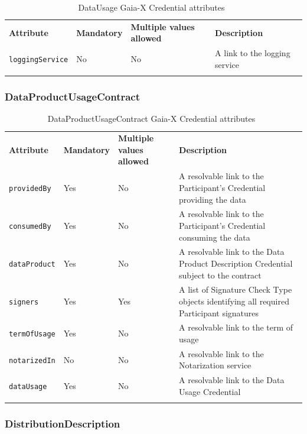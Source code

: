 \begin{longtable}{ |p{4cm}|p{2cm}|p{2cm}|p{7cm}| }
    \hhline{----}
    \textbf{Attribute} & \textbf{Mandatory} & \textbf{Multiple values allowed} & \textbf{Description}\\
    \hhline{----}
    \texttt{loggingService} & No & No & A link to the logging service\\
    \hhline{----}
    \caption{DataUsage Gaia-X Credential attributes~\cite{gaiax_data_exchange_document}}
    \label{tab:data_usage}
\end{longtable}

\subsubsection{DataProductUsageContract}

\begin{longtable}{ |p{4cm}|p{2cm}|p{2cm}|p{7cm}| }
    \hhline{----}
    \textbf{Attribute} & \textbf{Mandatory} & \textbf{Multiple values allowed} & \textbf{Description}\\
    \hhline{----}
    \texttt{providedBy} & Yes & No & A resolvable link to the Participant's Credential providing the data\\
    \hhline{----}
    \texttt{consumedBy} & Yes & No & A resolvable link to the Participant's Credential consuming the data\\
    \hhline{----}
    \texttt{dataProduct} & Yes & No & A resolvable link to the Data Product Description Credential subject to the contract\\
    \hhline{----}
    \texttt{signers} & Yes & Yes & A list of Signature Check Type objects identifying all required Participant signatures\\
    \hhline{----}
    \texttt{termOfUsage} & Yes & No & A resolvable link to the term of usage\\
    \hhline{----}
    \texttt{notarizedIn} & No & No & A resolvable link to the Notarization service\\
    \hhline{----}
    \texttt{dataUsage} & Yes & No & A resolvable link to the Data Usage Credential\\
    \hhline{----}
    \caption{DataProductUsageContract Gaia-X Credential attributes~\cite{gaiax_data_exchange_document}}
    \label{tab:data_product_usage_contract}
\end{longtable}

\subsubsection{DistributionDescription}

